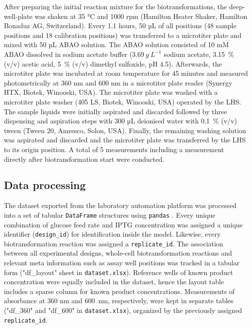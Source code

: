 \documentclass[sn-standardnature]{sn-jnl}%
\theoremstyle{thmstyleone}%
\theoremstyle{thmstyletwo}%
\theoremstyle{thmstylethree}%
\begin{document}
After preparing the initial reaction mixture for the biotransformations, the deep-well-plate was shaken at 35 °C and 1000 rpm (Hamilton Heater Shaker, Hamilton Bonaduz AG, Switzerland).
Every 1.1 hours, 50 µL of all positions (48 sample positions and 18 calibration positions) was transferred to a microtiter plate and mixed with 50 µL ABAO solution.
The ABAO solution consisted of 10 mM ABAO dissolved in sodium acetate buffer ($3.69\ g\ L^{-1}$ sodium acetate, 3.15~\% (v/v) acetic acid, 5~\% (v/v) dimethyl sulfoxide, pH 4.5).
Afterwards, the microtiter plate was incubated at room temperature for 45 minutes and measured photometrically at 360 nm and 600 nm in a microtiter plate reader (Synergy HTX, Biotek, Winooski, USA).
The microtiter plate was washed with a microtiter plate washer (405 LS, Biotek, Winooski, USA) operated by the LHS.
The sample liquids were initially aspirated and discarded followed by three dispensing and aspiration steps with 300 µL deionised water with 0.1~\% (v/v) tween (Tween 20, Amresco, Solon, USA).
Finally, the remaining washing solution was aspirated and discarded and the microtiter plate was transferred by the LHS to its origin position.
A total of 5 measurements including a measurement directly after biotransformation start were conducted.

\subsection{Data processing}
\label{sec_mm_computational}

The dataset exported from the laboratory automation platform was processed into a set of tabular \texttt{DataFrame} structures using \texttt{pandas} \cite{pandasSoftware,pandasPaper}.
Every unique combination of glucose feed rate and IPTG concentration was assigned a unique identifier (\texttt{design\_id}) for identification inside the model.
Likewise, every biotransformation reaction was assigned a \texttt{replicate\_id}.
The association between all experimental designs, whole-cell biotransformation reactions and relevant meta information such as assay well positions was tracked in a tabular form ("df\_layout" sheet in \texttt{dataset.xlsx}).
Reference wells of known product concentration were equally included in the dataset, hence the layout table includes a sparse column for known product concentrations.
Measurements of absorbance at 360 nm and 600~nm, respectively, were kept in separate tables ("df\_360" and "df\_600" in \texttt{dataset.xlsx}), organized by the previously assigned \texttt{replicate\_id}.
\end{document}
